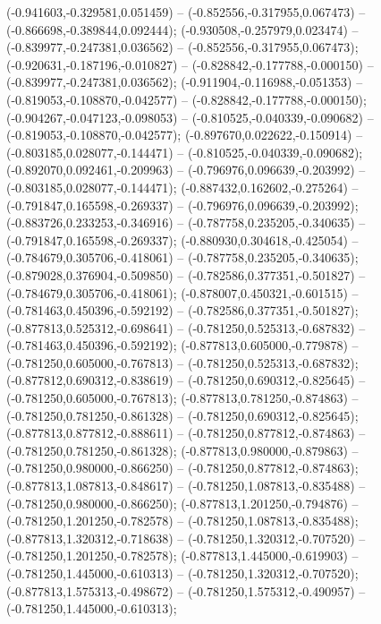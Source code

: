  (-0.941603,-0.329581,0.051459) -- (-0.852556,-0.317955,0.067473) -- (-0.866698,-0.389844,0.092444);
 (-0.930508,-0.257979,0.023474) -- (-0.839977,-0.247381,0.036562) -- (-0.852556,-0.317955,0.067473);
 (-0.920631,-0.187196,-0.010827) -- (-0.828842,-0.177788,-0.000150) -- (-0.839977,-0.247381,0.036562);
 (-0.911904,-0.116988,-0.051353) -- (-0.819053,-0.108870,-0.042577) -- (-0.828842,-0.177788,-0.000150);
 (-0.904267,-0.047123,-0.098053) -- (-0.810525,-0.040339,-0.090682) -- (-0.819053,-0.108870,-0.042577);
 (-0.897670,0.022622,-0.150914) -- (-0.803185,0.028077,-0.144471) -- (-0.810525,-0.040339,-0.090682);
 (-0.892070,0.092461,-0.209963) -- (-0.796976,0.096639,-0.203992) -- (-0.803185,0.028077,-0.144471);
 (-0.887432,0.162602,-0.275264) -- (-0.791847,0.165598,-0.269337) -- (-0.796976,0.096639,-0.203992);
 (-0.883726,0.233253,-0.346916) -- (-0.787758,0.235205,-0.340635) -- (-0.791847,0.165598,-0.269337);
 (-0.880930,0.304618,-0.425054) -- (-0.784679,0.305706,-0.418061) -- (-0.787758,0.235205,-0.340635);
 (-0.879028,0.376904,-0.509850) -- (-0.782586,0.377351,-0.501827) -- (-0.784679,0.305706,-0.418061);
 (-0.878007,0.450321,-0.601515) -- (-0.781463,0.450396,-0.592192) -- (-0.782586,0.377351,-0.501827);
 (-0.877813,0.525312,-0.698641) -- (-0.781250,0.525313,-0.687832) -- (-0.781463,0.450396,-0.592192);
 (-0.877813,0.605000,-0.779878) -- (-0.781250,0.605000,-0.767813) -- (-0.781250,0.525313,-0.687832);
 (-0.877812,0.690312,-0.838619) -- (-0.781250,0.690312,-0.825645) -- (-0.781250,0.605000,-0.767813);
 (-0.877813,0.781250,-0.874863) -- (-0.781250,0.781250,-0.861328) -- (-0.781250,0.690312,-0.825645);
 (-0.877813,0.877812,-0.888611) -- (-0.781250,0.877812,-0.874863) -- (-0.781250,0.781250,-0.861328);
 (-0.877813,0.980000,-0.879863) -- (-0.781250,0.980000,-0.866250) -- (-0.781250,0.877812,-0.874863);
 (-0.877813,1.087813,-0.848617) -- (-0.781250,1.087813,-0.835488) -- (-0.781250,0.980000,-0.866250);
 (-0.877813,1.201250,-0.794876) -- (-0.781250,1.201250,-0.782578) -- (-0.781250,1.087813,-0.835488);
 (-0.877813,1.320312,-0.718638) -- (-0.781250,1.320312,-0.707520) -- (-0.781250,1.201250,-0.782578);
 (-0.877813,1.445000,-0.619903) -- (-0.781250,1.445000,-0.610313) -- (-0.781250,1.320312,-0.707520);
 (-0.877813,1.575313,-0.498672) -- (-0.781250,1.575312,-0.490957) -- (-0.781250,1.445000,-0.610313);
